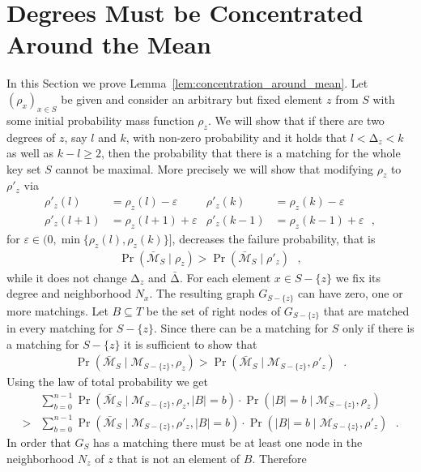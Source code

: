 \let\accentvec\vec \documentclass{llncs}
\newcommand{\keys}{\ensuremath{n}}
\newcommand{\pmf}{\ensuremath{{\rho}}}
\newcommand{\mean}{{\mathrm{\scriptstyle\Delta}}}
\newcommand{\Amean}{\bar{\mean}}
\newcommand{\eps}{\ensuremath{\varepsilon}}
\newcommand{\blank}{\text{ }}
\newcommand{\graph}{\ensuremath{G}}
\newcommand{\low}{\ensuremath{l}}
\newcommand{\high}{\ensuremath{k}}
\newcommand{\abs}[1]{\lvert#1\rvert}
\newcommand{\evNM}{\bar{\mathcal{M}}}
\newcommand{\evM}{{\mathcal{M}}}
\begin{document}
\section{Degrees Must be Concentrated Around the Mean}
\label{app:lemma_concentration}
In this Section we prove Lemma~\ref{lem:concentration_around_mean}.
Let $(\pmf_x)_{x\in S}$ be given and consider an arbitrary but fixed element $z$ from $S$ with some initial probability mass function $\pmf_z$.
We will show that if there are two degrees of $z$, say $\low$ and $\high$, with non-zero probability and
it holds that $\low < \mean_z < \high$ as well as $\high-\low\geq 2$, then the probability that there is a matching for
the whole key set $S$ cannot be maximal.
More precisely we will show that modifying $\pmf_z$ to $\pmf'_z$ via 
\begin{align*}
\pmf'_z(\low)  &=\pmf_z(\low)-\eps     &\pmf'_z(\high)&=\pmf_z(\high)-\eps \\
\pmf'_z(\low+1)&=\pmf_z(\low+1)+\eps   &\pmf'_z(\high-1)&=\pmf_z(\high-1)+\eps \blank,
\end{align*}
for $\eps \in (0, \min\{\pmf_z(\low),\pmf_z(\high)\}]$, decreases the failure probability,
that is
\begin{align*}
\Pr\left( \evNM_S \mid \pmf_z \right) > \Pr\left( \evNM_S \mid \pmf'_z\right) \blank,
\end{align*}
while it does not change $\mean_z$ and $\Amean$.
For each element $x \in S- \{z\} $ we fix its degree and neighborhood $N_x$.
The resulting graph $\graph_{S-\{z\}}$ can have zero, one or more matchings.
Let $B\subseteq {T}$ be the set of right nodes of $\graph_{S- \{z\}}$ that are matched in every matching
for $S- \{z\}$. Since there can be a matching for $S$ only if there is a matching for $S-\{z\}$ it is sufficient to show that
\begin{align}
\label{eq:failure_lemma_1}
 \Pr\left( \evNM_S \mid \evM_{S-\{z\}}, \pmf_z \right) > \Pr\left( \evNM_S \mid \evM_{S-\{z\}}, \pmf'_z\right) \blank.
\end{align}
Using the law of total probability we get
\begin{align*}
   &\sum_{b=0}^{\keys-1}\Pr\left( \evNM_S \mid \evM_{S-\{z\}}, \pmf_z,  \abs{B}=b \right)\cdot \Pr\left(\abs{B}=b \mid \evM_{S-\{z\}}, \pmf_z \right)\\
 > &\sum_{b=0}^{\keys-1}\Pr\left( \evNM_S \mid \evM_{S-\{z\}}, \pmf'_z, \abs{B}=b \right)\cdot \Pr\left(\abs{B}=b \mid \evM_{S-\{z\}}, \pmf'_z \right)\blank.
\end{align*}
In order that $\graph_S$ has a matching there must be at least one node in the neighborhood $N_z$ of $z$ that is not an element of $B$. Therefore
\end{document}
